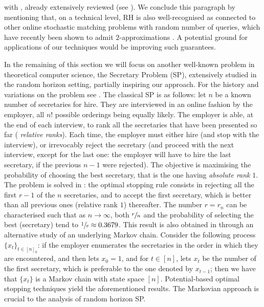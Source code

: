 \documentclass[11pt, a4paper, twoside]{article}
\numberwithin{equation}{section}
\begin{document}
with \cite{AliBanGolMunWan20}, already extensively reviewed (see ). We conclude this paragraph by mentioning that, on a technical level, RH is also well-recognised as connected to other online stochastic matching problems with random number of queries, which have recently been shown to admit $2$-approximations \cite{AouMa23}. A potential ground for applications of our techniques would be improving such guarantees.
	
	In the remaining of this section we will focus on another well-known problem in theoretical computer science, the Secretary Problem (SP), extensively studied in the random horizon setting, partially inspiring our approach. For the history and variations on the problem see \cite{GilMost66,Free83}. The classical SP is as follows: let $n$ be a known number of secretaries for hire. They are interviewed in an online fashion by the employer, all $n!$ possible orderings being equally likely. The employer is able, at the end of each interview, to rank all the secretaries that have been presented so far ( \textit{relative ranks}). Each time, the employer must either hire (and stop with the interview), or irrevocably reject the secretary (and proceed with the next interview, except for the last one: the employer will have to hire the last secretary, if the previous $n-1$ were rejected). The objective is maximising the probability of choosing the best secretary, that is the one having \textit{absolute rank} $1$. The problem is solved in \cite{Lind61}: the optimal stopping rule consists in rejecting all the first $r-1$ of the $n$ secretaries, and to accept the first secretary, which is better than all previous ones (relative rank $1$) thereafter. The number $r=r_n$ can be characterised such that as $n\longrightarrow\infty$, both $\sfrac{r}{n}$ and the probability of selecting the best (secretary) tend to $\sfrac{1}{e}\approx 0.3679$. This result is also obtained in \cite{Dynk63} through an alternative study of an underlying Markov chain. Consider the following process $\{x_t\}_{t\in[n]_0}$: if the employer enumerates the secretaries in the order in which they are encountered, and then lets $x_0=1$, and for $t\in[n]$, lets $x_t$ be the number of the first secretary, which is preferable to the one denoted by $x_{t-1}$; then we have that $\{x_t\}$ is a Markov chain with state space $[n]$. Potential-based optimal stopping techniques yield the aforementioned results. The Markovian approach is crucial to the analysis of random horizon SP.
	
\end{document}
